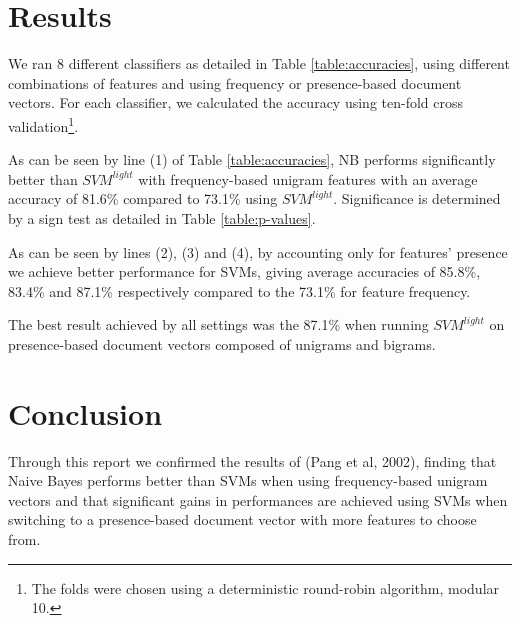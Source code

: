 \documentclass[12pt]{article}
\begin{document}
\begin{multicols}{2}
\section{Results}

We ran 8 different classifiers as detailed in Table \ref{table:accuracies}, using different combinations of features and using frequency or presence-based document vectors. For each classifier, we calculated the accuracy using ten-fold cross validation\footnote{The folds were chosen using a deterministic round-robin algorithm, modular 10.}.

As can be seen by line (1) of Table \ref{table:accuracies}, NB performs significantly better than $SVM^{light}$ with frequency-based unigram features with an average accuracy of 81.6\% compared to 73.1\% using $SVM^{light}$. Significance is determined by a sign test as detailed in Table \ref{table:p-values}.

As can be seen by lines (2), (3) and (4), by accounting only for features' presence we achieve better performance for SVMs, giving average accuracies of 85.8\%, 83.4\% and 87.1\% respectively compared to the 73.1\%  for feature frequency.

The best result achieved by all settings was the 87.1\% when running $SVM^{light}$ on presence-based document vectors composed of unigrams and bigrams.

\section*{Conclusion}

Through this report we confirmed the results of (Pang et al, 2002), finding that Naive Bayes performs better than SVMs when using frequency-based unigram vectors and that significant gains in performances are achieved using SVMs when switching to a presence-based document vector with more features to choose from.

\end{multicols}
\end{document}
